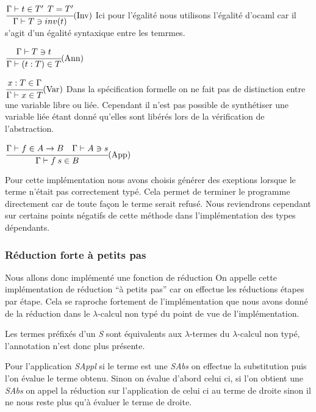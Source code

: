 \documentclass {article}
\newcommand{\codefrom}[3]
           {}
\theoremstyle{definition}
\theoremstyle{remark}
\begin{document}
\codefrom{typed}{lambda}{check_inv}
$\cfrac{\Gamma \vdash t \in T' \:\: T=T'}
         {\Gamma\vdash T \ni inv(t)}\mbox{(Inv)}$
Ici pour l'égalité nous utilisons l'égalité d'ocaml car il s'agit d'un égalité syntaxique entre les temrmes.


\codefrom{typed}{lambda}{synth_ann}
$\cfrac{\Gamma\vdash T \ni t}
         {\Gamma\vdash (t:T) \in T}\mbox{(Ann)}$

\codefrom{typed}{lambda}{synth_var}
$\cfrac{x:T \in \Gamma}
         {\Gamma \vdash x \in T }\mbox{(Var)}$
Dans la spécification formelle on ne fait pas de distinction entre une variable libre ou liée.
Cependant il n'est pas possible de synthétiser une variable liée étant donné qu'elles sont libérés lors
de la vérification de l'abstraction.

\codefrom{typed}{lambda}{synth_appl}
$\cfrac{\Gamma \vdash f \in A\rightarrow B \quad \Gamma\vdash A \ni s }
         {\Gamma\vdash f\:s\in B}\mbox{(App)}$


Pour cette implémentation nous avons choisis générer des exeptions lorsque le terme
n'était pas correctement typé. Cela permet de terminer le programme directement car de toute
façon le terme serait refusé. Nous reviendrons cependant sur certains points négatifs de cette
méthode dans l'implémentation des types dépendants.


\subsubsection{Réduction forte à petits pas}
\label{reduction_petits_pas}


Nous allons donc implémenté une fonction de réduction 
On appelle cette implémentation de réduction ``à petits pas'' car 
on effectue les réductions étapes par étape. Cela se raproche fortement 
de l'implémentation que nous avons donné de la réduction dans le $\lambda$-calcul
non typé du point de vue de l'implémentation.

Les termes préfixés d'un \emph{S} sont équivalents aux $\lambda$-termes 
du $\lambda$-calcul non typé, l'annotation n'est donc plus présente.

\codefrom{typed}{lambda}{reduction_forte}

Pour l'application \emph{SAppl} si le terme est une \emph{SAbs} on 
effectue la substitution puis l'on évalue le terme obtenu.
Sinon on évalue d'abord celui ci, si l'on obtient une \emph{SAbs} 
on appel la réduction sur l'application de celui ci au terme de droite
sinon il ne nous reste plus qu'à évaluer le terme de droite.
\end{document}
